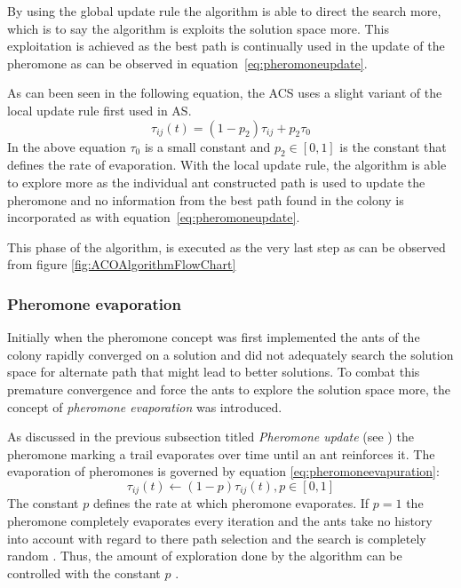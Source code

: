 By using the global update rule the algorithm is able to direct the search more, which is to say the algorithm is exploits the solution space more. This exploitation is achieved as the best path is continually used in the update of the pheromone as can be observed in equation~\ref{eq:pheromoneupdate}\cite{CompuIntelligenceIntro,FundamentalSwarm}.

As can been seen in the following equation, the ACS uses a slight variant of the local update rule first used in AS\cite{CompuIntelligenceIntro}.
\begin{equation}
	\tau_{ij}(t) = (1 - p_2)\tau_{ij} + p_2\tau_0
\end{equation}
In the above equation $\tau_0$ is a small constant and $p_2 \in [0,1]$ is the constant that defines the rate of evaporation\cite{CompuIntelligenceIntro}. With the local update rule, the algorithm is able to explore more as the individual ant constructed path is used to update the pheromone and no information from the best path found in the colony is incorporated as with equation~\ref{eq:pheromoneupdate}\cite{CompuIntelligenceIntro,FundamentalSwarm}.

This phase of the algorithm, is executed as the very last step as can be observed from figure \ref{fig:ACOAlgorithmFlowChart}

\subsubsection{Pheromone evaporation}
\label{sec:pheromoneevapuation}
Initially when the pheromone concept was first implemented the ants of the colony rapidly converged on a solution and did not adequately search the solution space for alternate path that might lead to better solutions. To combat this premature convergence and force the ants to explore the solution space more, the concept of \emph{pheromone evaporation} was introduced\cite{CompuIntelligenceIntro,AntsAndStigmergy,AntIntroTrends,AntSurvey}. 

As discussed in the previous subsection titled \emph{Pheromone update} (see \pageref{sec:pheromonetrail}) the pheromone marking a trail evaporates over time until an ant reinforces it. The evaporation of pheromones is governed by equation \ref{eq:pheromoneevapuration}\cite{CompuIntelligenceIntro,AntsAndStigmergy,AntIntroTrends,AntSurvey}:
\begin{equation}
\label{eq:pheromoneevapuration}
	\tau_{ij}(t) \leftarrow (1-p)\tau_{ij}(t), p\in [0,1]
\end{equation}
The constant $p$ defines the rate at which pheromone evaporates. If $p=1$ the pheromone completely evaporates every iteration and the ants take no history into account with regard to there path selection and the search is completely random \cite{CompuIntelligenceIntro,AntsAndStigmergy}. Thus, the amount of exploration done by the algorithm can be controlled with the constant $p$ \cite{CompuIntelligenceIntro,AntsAndStigmergy}.

